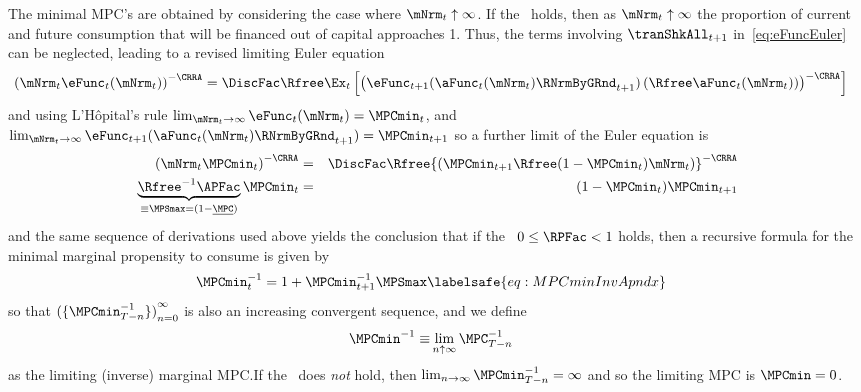 \documentclass[\econtexRoot/BufferStockTheory]{subfiles}
\begin{document}
The minimal MPC's are obtained by considering the case where $\mNrm_{t} \uparrow \infty$.
If the \FHWC~holds, then as $\mNrm_{t} \uparrow \infty$ the proportion of current and future consumption that will be financed out of capital approaches 1.
Thus, the terms involving $\tranShkAll_{t+1}$ in~\eqref{eq:eFuncEuler} can be neglected, leading to a revised limiting Euler equation
\begin{eqnarray*}
 {({\mNrm_{t}}\eFunc_{t}(\mNrm_{t}))}^{-\CRRA}  & = \DiscFac \Rfree \Ex_{t}\left[{\left(\eFunc_{t+1}(\aFunc_{t}(\mNrm_{t})\RNrmByGRnd_{t+1})\left({\Rfree \aFunc_{t}(\mNrm_{t})}\right)\right)}^{-\CRRA}\right]
\end{eqnarray*}
and using L'H\^opital's rule $\lim_{\mNrm_{t} \rightarrow \infty} \eFunc_{t}(\mNrm_{t}) = \MPCmin_{t}$, and $\lim_{\mNrm_{t} \rightarrow \infty} \eFunc_{t+1}(\aFunc_{t}(\mNrm_{t})\RNrmByGRnd_{t+1}) = \MPCmin_{t+1}$ so a further limit of the Euler equation is\hypertarget{MPCnvrs}{}
\begin{eqnarray*}
  {(\mNrm_{t}\MPCmin_{t})}^{-\CRRA}  & = & \DiscFac \Rfree {\left(\MPCmin_{t+1} \Rfree (1-\MPCmin_{t})\mNrm_{t}\right)}^{-\CRRA}
\\ \underbrace{{\Rfree}^{-1}{\APFac}}_{\equiv \MPSmax = (1-\underline{\MPC})} \MPCmin_{t}  & = & (1-\MPCmin_{t}) \MPCmin_{t+1}
\end{eqnarray*}
and the same sequence of derivations used above yields the conclusion
that if the \RIC~$0 \leq \RPFac < 1$ holds, then a recursive formula for the
minimal marginal propensity to consume is given by
\begin{equation}\begin{gathered}\begin{aligned}
 \MPCmin_{t}^{-1}  & = 1+\MPCmin_{t+1}^{-1}\MPSmax  \labelsafe{eq:MPCminInvApndx}
\end{aligned}\end{gathered}\end{equation}
so that ${(\{\MPCmin_{T-n}^{-1}\})}_{n=0}^{\infty}$ is also an increasing
convergent sequence, and we define
\begin{equation}\begin{gathered}\begin{aligned}
\MPCmin^{-1} \equiv &\lim_{n \uparrow \infty} \MPC_{T-n}^{-1}  
\end{aligned}\end{gathered}\end{equation}
as the limiting (inverse) marginal MPC.\@  If the \RIC~does \textit{not} hold, then $\lim_{n \rightarrow \infty} \MPCmin_{T-n}^{-1} = \infty$
and so the limiting MPC is $\MPCmin = 0$.
\end{document}
